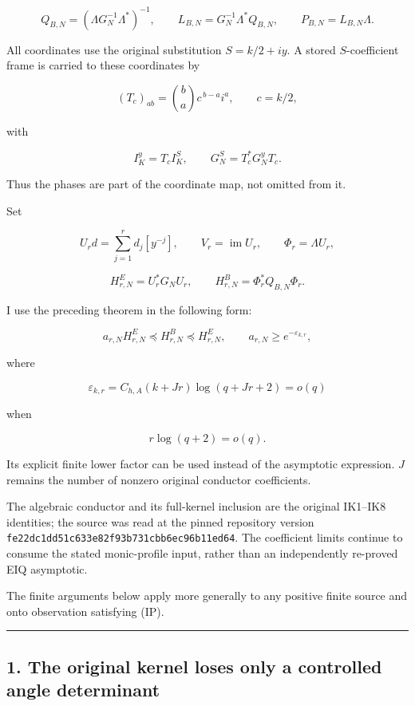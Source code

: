 \documentclass[11pt]{article}
\begin{document}
\[
Q_{B,N}=(\Lambda G_N^{-1}\Lambda^*)^{-1},
\qquad
L_{B,N}=G_N^{-1}\Lambda^*Q_{B,N},
\qquad
P_{B,N}=L_{B,N}\Lambda.
\]

All coordinates use the original substitution \(S=k/2+iy\). A stored \(S\)-coefficient frame is carried to these coordinates by

\[
(T_c)_{ab}=\binom ba c^{\,b-a}i^a,\qquad c=k/2,
\]

with

\[
I_K^y=T_cI_K^S,\qquad G_N^S=T_c^*G_N^yT_c.
\]

Thus the phases are part of the coordinate map, not omitted from it.

Set

\[
U_rd=\sum_{j=1}^r d_j[y^{-j}],\qquad
V_r=\operatorname{im}U_r,\qquad
\Phi_r=\Lambda U_r,
\]

\[
H^E_{r,N}=U_r^*G_NU_r,\qquad
H^B_{r,N}=\Phi_r^*Q_{B,N}\Phi_r.
\]

I use the preceding theorem in the following form:

\[
\boxed{
a_{r,N}H^E_{r,N}\preceq H^B_{r,N}\preceq H^E_{r,N},
\qquad
a_{r,N}\ge e^{-\varepsilon_{k,r}},
}
\tag{IP}
\]

where

\[
\varepsilon_{k,r}
=
C_{h,A}(k+Jr)\log(q+Jr+2)=o(q)
\]

when

\[
r\log(q+2)=o(q).
\]

Its explicit finite lower factor can be used instead of the asymptotic expression. \(J\) remains the number of nonzero original conductor coefficients.

The algebraic conductor and its full-kernel inclusion are the original IK1--IK8 identities; the source was read at the pinned repository version \nolinkurl{fe22dc1dd51c633e82f93b731cbb6ec96b11ed64}. The coefficient limits continue to consume the stated monic-profile input, rather than an independently re-proved EIQ asymptotic.

The finite arguments below apply more generally to any positive finite source and onto observation satisfying (IP).

\begin{center}\rule{0.5\linewidth}{0.5pt}\end{center}

\subsection{1. The original kernel loses only a controlled angle determinant}\label{the-original-kernel-loses-only-a-controlled-angle-determinant}
\end{document}
